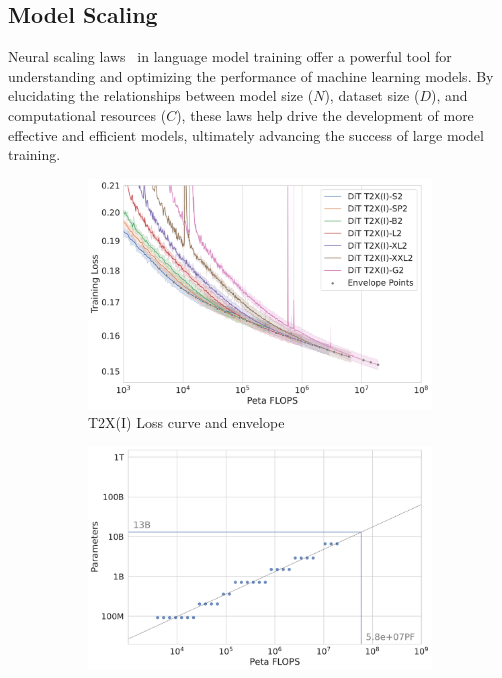 \subsection{Model Scaling}
Neural scaling laws~\cite{kaplan2020scaling,hoffmann2022training} in language model training offer a powerful tool for understanding and optimizing the performance of machine learning models. By elucidating the relationships between model size ($N$), dataset size ($D$), and computational resources ($C$), these laws help drive the development of more effective and efficient models, ultimately advancing the success of large model training.

\begin{figure}[t]
    \centering
    \begin{subfigure}{0.325\textwidth}
        \centering
        \includegraphics[width=\textwidth]{figures/scaling_law.pdf}
        \caption{T2X(I) Loss curve and envelope}
        \label{fig:scaling-laws}
    \end{subfigure}
    \hfill
    \begin{subfigure}{0.325\textwidth}
        \centering
        \includegraphics[width=\textwidth]{figures/computation_vs_parameter.pdf}

\end{subfigure}
\end{figure}
